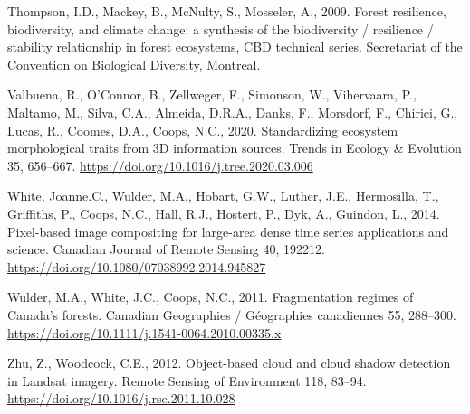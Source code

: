 \documentclass[
]{agujournal2019}
\newlength{\cslhangindent}
\newenvironment{CSLReferences}[2] %
 {\begin{list}{}{%
  \setlength{\itemindent}{0pt}
  \setlength{\leftmargin}{0pt}
  \setlength{\parsep}{0pt}
  \ifodd #1
   \setlength{\leftmargin}{\cslhangindent}
   \setlength{\itemindent}{-1\cslhangindent}
  \fi
  \setlength{\itemsep}{#2\baselineskip}}}
 {\end{list}}
\begin{document}
\begin{CSLReferences}{1}{0}
Thompson, I.D., Mackey, B., McNulty, S., Mosseler, A., 2009. Forest
resilience, biodiversity, and climate change: a synthesis of the
biodiversity / resilience / stability relationship in forest ecosystems,
CBD technical series. Secretariat of the Convention on Biological
Diversity, Montreal.

Valbuena, R., O'Connor, B., Zellweger, F., Simonson, W., Vihervaara, P.,
Maltamo, M., Silva, C.A., Almeida, D.R.A., Danks, F., Morsdorf, F.,
Chirici, G., Lucas, R., Coomes, D.A., Coops, N.C., 2020. Standardizing
ecosystem morphological traits from 3D information sources. Trends in
Ecology \& Evolution 35, 656--667.
\url{https://doi.org/10.1016/j.tree.2020.03.006}

White, Joanne.C., Wulder, M.A., Hobart, G.W., Luther, J.E., Hermosilla,
T., Griffiths, P., Coops, N.C., Hall, R.J., Hostert, P., Dyk, A.,
Guindon, L., 2014. Pixel-based image compositing for large-area dense
time series applications and science. Canadian Journal of Remote Sensing
40, 192212. \url{https://doi.org/10.1080/07038992.2014.945827}

Wulder, M.A., White, J.C., Coops, N.C., 2011. Fragmentation regimes of
Canada's forests. Canadian Geographies / Géographies canadiennes 55,
288--300. \url{https://doi.org/10.1111/j.1541-0064.2010.00335.x}

Zhu, Z., Woodcock, C.E., 2012. Object-based cloud and cloud shadow
detection in Landsat imagery. Remote Sensing of Environment 118, 83--94.
\url{https://doi.org/10.1016/j.rse.2011.10.028}

\end{CSLReferences}
\end{document}
